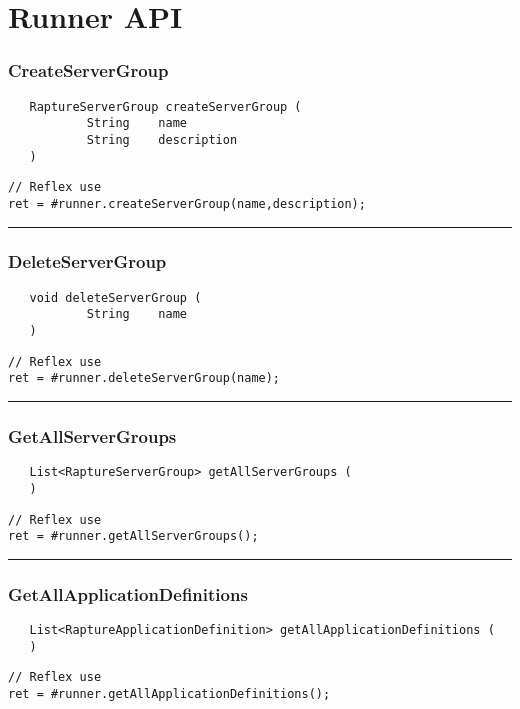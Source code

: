 \section{Runner API}

\subsubsection{CreateServerGroup}
\label{Api:CreateServerGroup}
\begin{verbatim}
   RaptureServerGroup createServerGroup (
           String    name
           String    description
   )
\end{verbatim}
\begin{lstlisting}[language=reflex]
// Reflex use
ret = #runner.createServerGroup(name,description);
\end{lstlisting}



\rule{15cm}{2pt}
\subsubsection{DeleteServerGroup}
\label{Api:DeleteServerGroup}
\begin{verbatim}
   void deleteServerGroup (
           String    name
   )
\end{verbatim}
\begin{lstlisting}[language=reflex]
// Reflex use
ret = #runner.deleteServerGroup(name);
\end{lstlisting}



\rule{15cm}{2pt}
\subsubsection{GetAllServerGroups}
\label{Api:GetAllServerGroups}
\begin{verbatim}
   List<RaptureServerGroup> getAllServerGroups (
   )
\end{verbatim}
\begin{lstlisting}[language=reflex]
// Reflex use
ret = #runner.getAllServerGroups();
\end{lstlisting}



\rule{15cm}{2pt}
\subsubsection{GetAllApplicationDefinitions}
\label{Api:GetAllApplicationDefinitions}
\begin{verbatim}
   List<RaptureApplicationDefinition> getAllApplicationDefinitions (
   )
\end{verbatim}
\begin{lstlisting}[language=reflex]
// Reflex use
ret = #runner.getAllApplicationDefinitions();
\end{lstlisting}



